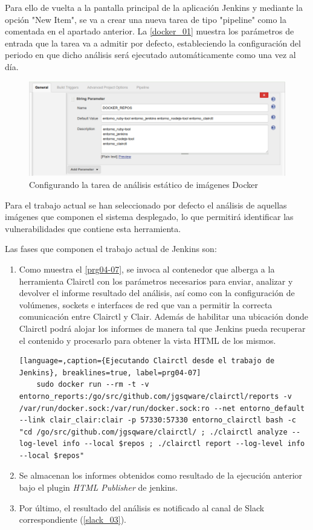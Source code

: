 Para ello de vuelta a la pantalla principal de la aplicación Jenkins y mediante la opción "New Item", se va a crear una nueva tarea de tipo "pipeline" como la comentada en el apartado anterior. La \autoref{docker_01} muestra los parámetros de entrada que la tarea va a admitir por defecto, estableciendo la configuración del periodo en que dicho análisis será ejecutado automáticamente como una vez al día.

\begin{figure}[htbp]
	\centering
	\includegraphics[width=1.00\linewidth]
	{desarrollo/figuras/docker_01.png}
	\caption{Configurando la tarea de análisis estático de imágenes Docker}
	\label{docker_01}
\end{figure}

Para el trabajo actual se han seleccionado por defecto el análisis de aquellas imágenes que componen el sistema desplegado, lo que permitirá identificar las vulnerabilidades que contiene esta herramienta.

Las fases que componen el trabajo actual de Jenkins son:

\begin{enumerate}
	\item Como muestra el \autoref{prg04-07}, se invoca al contenedor que alberga a la herramienta Clairctl con los parámetros necesarios para enviar, analizar y devolver el informe resultado del análisis, así como con la configuración de volúmenes, sockets e interfaces de red que van a permitir la correcta comunicación entre Clairctl y Clair. Además de habilitar una ubicación donde Clairctl podrá alojar los informes de manera tal que Jenkins pueda recuperar el contenido y procesarlo para obtener la vista HTML de los mismos.
	\begin{lstlisting}[language=,caption={Ejecutando Clairctl desde el trabajo de Jenkins}, breaklines=true, label=prg04-07]
	sudo docker run --rm -t -v entorno_reports:/go/src/github.com/jgsqware/clairctl/reports -v /var/run/docker.sock:/var/run/docker.sock:ro --net entorno_default --link clair_clair:clair -p 57330:57330 entorno_clairctl bash -c "cd /go/src/github.com/jgsqware/clairctl/ ; ./clairctl analyze --log-level info --local $repos ; ./clairctl report --log-level info --local $repos"
	\end{lstlisting}
	\item Se almacenan los informes obtenidos como resultado de la ejecución anterior bajo el plugin \textit{HTML Publisher} de jenkins.
	\item Por último, el resultado del análisis es notificado al canal de Slack correspondiente (\autoref{slack_03}). 
\end{enumerate}

